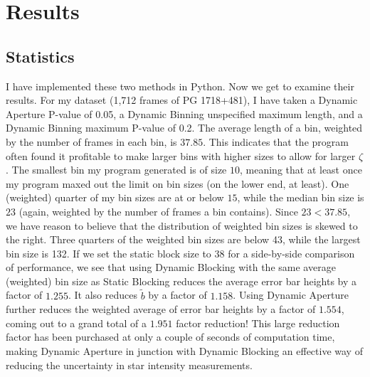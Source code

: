\documentclass[12pt]{article}
\begin{document}
\section{Results}
\subsection{Statistics}
\indent \indent I have implemented these two methods in Python. Now we get to examine their results. For my dataset (1,712 frames of PG 1718+481), I have taken a Dynamic Aperture P-value of 0.05, a Dynamic Binning unspecified maximum length, and a Dynamic Binning maximum P-value of 0.2. The average length of a bin, weighted by the number of frames in each bin, is $ 37.85 $. This indicates that the program often found it profitable to make larger bins with higher sizes to allow for larger $ \zeta $. The smallest bin my program generated is of size $ 10 $, meaning that at least once my program maxed out the limit on bin sizes (on the lower end, at least). One (weighted) quarter of my bin sizes are at or below $ 15 $, while the median bin size is $ 23 $ (again, weighted by the number of frames a bin contains). Since $ 23 < 37.85 $, we have reason to believe that the distribution of weighted bin sizes is skewed to the right. Three quarters of the weighted bin sizes are below 43, while the largest bin size is 132. If we set the static block size to $ 38 $ for a side-by-side comparison of performance, we see that using Dynamic Blocking with the same average (weighted) bin size as Static Blocking reduces the average error bar heights by a factor of $ 1.255 $. It also reduces $ \tilde{b} $ by a factor of $ 1.158 $. Using Dynamic Aperture further reduces the weighted average of error bar heights by a factor of $ 1.554 $, coming out to a grand total of a $ 1.951 $ factor reduction! This large reduction factor has been purchased at only a couple of seconds of computation time, making Dynamic Aperture in junction with Dynamic Blocking an effective way of reducing the uncertainty in star intensity measurements. 
\end{document}
